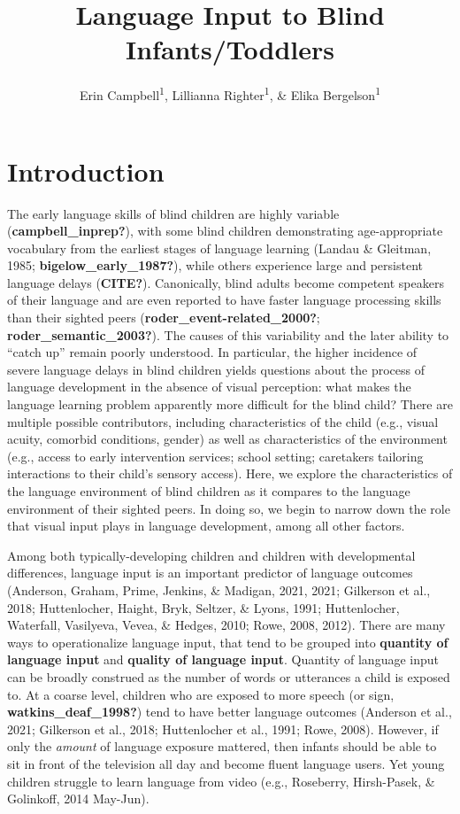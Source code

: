 \documentclass[
  man]{apa6}
\title{Language Input to Blind Infants/Toddlers}
\author{Erin Campbell\textsuperscript{1}, Lillianna Righter\textsuperscript{1}, \& Elika Bergelson\textsuperscript{1}}
\date{}
\affiliation{\vspace{0.5cm}\textsuperscript{1} Department of Psychology \& Neuroscience, Duke University, Durham, NC}
\begin{document}
\maketitle

\hypertarget{introduction}{%
\section{Introduction}\label{introduction}}

The early language skills of blind children are highly variable (\textbf{campbell\_inprep?}), with some blind children demonstrating age-appropriate vocabulary from the earliest stages of language learning (Landau \& Gleitman, 1985; \textbf{bigelow\_early\_1987?}), while others experience large and persistent language delays (\textbf{CITE?}). Canonically, blind adults become competent speakers of their language and are even reported to have faster language processing skills than their sighted peers (\textbf{roder\_event-related\_2000?}; \textbf{roder\_semantic\_2003?}). The causes of this variability and the later ability to ``catch up'' remain poorly understood. In particular, the higher incidence of severe language delays in blind children yields questions about the process of language development in the absence of visual perception: what makes the language learning problem apparently more difficult for the blind child? There are multiple possible contributors, including characteristics of the child (e.g., visual acuity, comorbid conditions, gender) as well as characteristics of the environment (e.g., access to early intervention services; school setting; caretakers tailoring interactions to their child's sensory access). Here, we explore the characteristics of the language environment of blind children as it compares to the language environment of their sighted peers. In doing so, we begin to narrow down the role that visual input plays in language development, among all other factors.

Among both typically-developing children and children with developmental differences, language input is an important predictor of language outcomes (Anderson, Graham, Prime, Jenkins, \& Madigan, 2021, 2021; Gilkerson et al., 2018; Huttenlocher, Haight, Bryk, Seltzer, \& Lyons, 1991; Huttenlocher, Waterfall, Vasilyeva, Vevea, \& Hedges, 2010; Rowe, 2008, 2012). There are many ways to operationalize language input, that tend to be grouped into \textbf{quantity of language input} and \textbf{quality of language input}. Quantity of language input can be broadly construed as the number of words or utterances a child is exposed to. At a coarse level, children who are exposed to more speech (or sign, \textbf{watkins\_deaf\_1998?}) tend to have better language outcomes (Anderson et al., 2021; Gilkerson et al., 2018; Huttenlocher et al., 1991; Rowe, 2008). However, if only the \emph{amount} of language exposure mattered, then infants should be able to sit in front of the television all day and become fluent language users. Yet young children struggle to learn language from video (e.g., Roseberry, Hirsh-Pasek, \& Golinkoff, 2014 May-Jun).
\end{document}
